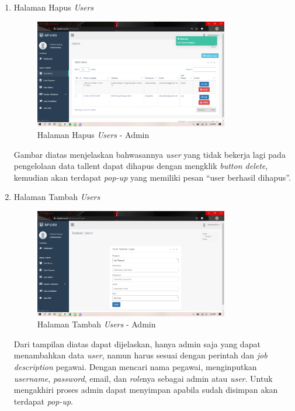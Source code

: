 \begin{enumerate}
	\newpage
	\item Halaman Hapus \textit{Users}
	\begin{figure}
		\centering
		\includegraphics[width=0.8\textwidth]
		{pics/admin/implementasi/hapususers.png}
		\caption{Halaman Hapus \textit{Users} - Admin}
		\label{fig:CC10}
	\end{figure}
	Gambar diatas menjelaskan bahwasannya \textit{user} yang tidak bekerja lagi pada pengelolaan data tallent dapat dihapus dengan mengklik \textit{button delete}, kemudian akan terdapat \textit{pop-up} yang memiliki pesan “user berhasil dihapus”. 
	
	\item Halaman Tambah \textit{Users}
	\begin{figure}
		\centering
		\includegraphics[width=0.8\textwidth]
		{pics/admin/implementasi/tambahusers.png}
		\caption{Halaman Tambah \textit{Users} - Admin}
		\label{fig:CC10}
	\end{figure}
	Dari tampilan diatas dapat dijelaskan, hanya admin saja yang dapat menambahkan data \textit{user}, namun harus sesuai dengan perintah dan \textit{job description} pegawai. Dengan mencari nama pegawai, menginputkan \textit{username}, \textit{password}, email, dan \textit{role}nya sebagai admin atau \textit{user}. Untuk mengakhiri proses admin dapat menyimpan apabila sudah disimpan akan terdapat \textit{pop-up}.
	

\end{enumerate}
